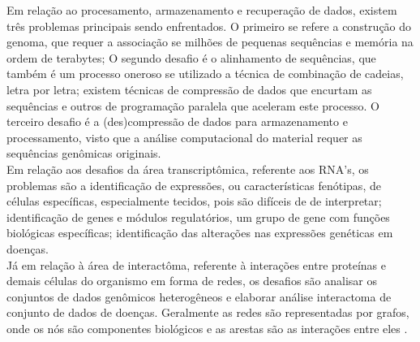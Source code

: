 \indent Em relação ao procesamento, armazenamento e recuperação  de dados, existem três problemas principais sendo enfrentados. O primeiro se refere a construção do genoma, que requer a associação se milhões de pequenas sequências e memória na ordem de terabytes; O segundo desafio é o alinhamento de sequências, que também é um processo oneroso se utilizado a técnica de combinação de cadeias, letra por letra; existem técnicas de compressão de dados que encurtam as sequências e outros de programação paralela que aceleram este processo. O terceiro desafio é a (des)compressão de dados para armazenamento e processamento, visto que a análise computacional do material requer as sequências genômicas originais. \\

\indent Em relação aos desafios da área transcriptômica, referente aos RNA's, os problemas são a identificação de expressões, ou características fenótipas, de células específicas, especialmente tecidos, pois são difíceis de de interpretar; identificação de genes e módulos regulatórios, um grupo de gene com funções biológicas específicas; identificação das alterações nas expressões genéticas em doenças. \\

\indent Já em relação à área de interactôma, referente à interações entre proteínas e demais células do organismo em forma de redes, os desafios são analisar os conjuntos de dados genômicos heterogêneos e elaborar análise interactoma de conjunto de dados de doenças. Geralmente as redes são representadas por grafos, onde os nós são componentes biológicos e as arestas são as interações entre eles \cite{berger13}. \\

